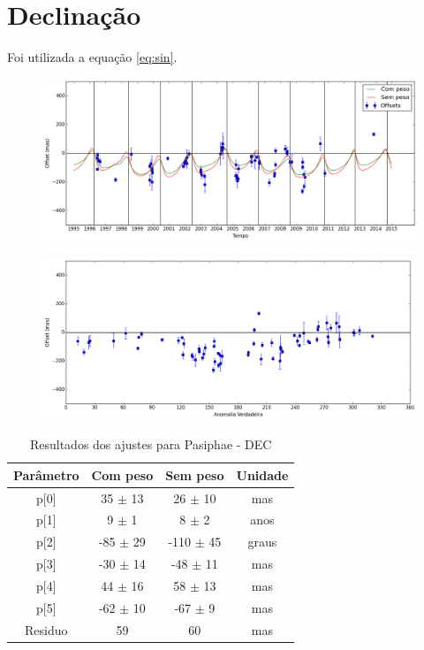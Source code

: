 \documentclass[11pt,a4paper]{report}
\begin{document}
\section*{Declinação}

Foi utilizada a equação \ref{eq:sin}.

\begin{figure}[h]
\includegraphics[scale=0.45]{Pasiphae/DEC.png} 
\end{figure}

\begin{figure}[h]
\includegraphics[scale=0.45]{Pasiphae/DEC_anom.png}  
\end{figure}

\begin{table}[h!]
\caption{\label{Tab: Pasiphae-DEC} Resultados dos ajustes para Pasiphae - DEC}
\begin{centering}
\begin{tabular}{cccc}
\hline
\hline
Parâmetro & Com peso & Sem peso & Unidade\tabularnewline
\hline
p[0] & 35 $\pm$ 13 & 26 $\pm$ 10 & mas\\
p[1] & 9 $\pm$ 1 & 8 $\pm$ 2 & anos\\
p[2] & -85 $\pm$ 29 & -110 $\pm$ 45 & graus\\
p[3] & -30 $\pm$ 14 & -48 $\pm$ 11 & mas\\
p[4] & 44 $\pm$ 16 & 58 $\pm$ 13 & mas\\
p[5] & -62 $\pm$ 10 & -67 $\pm$ 9 & mas\\
Residuo & 59 & 60 & mas\\
\hline 
\end{tabular} 
\par\end{centering}
\end{table}
\end{document}
